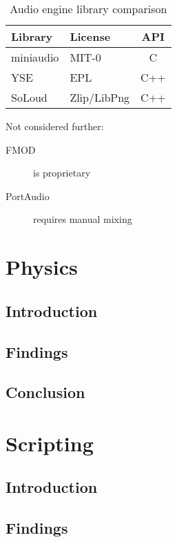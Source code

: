 \documentclass{projdoc}
\begin{document}
\begin{table}
	\centering
	\begin{tabular}{llc}
		\toprule
		\textbf{Library} & \textbf{License} & \textbf{API}\\
		\midrule
		miniaudio & MIT-0 & C\\
		YSE & EPL & C++\\
		SoLoud & Zlip/LibPng & C++\\
		\bottomrule
	\end{tabular}
	\caption{Audio engine library comparison}
	\label{tab:audio-engines}
\end{table}

Not considered further:
\begin{description}
	\item[FMOD] is proprietary
	\item[PortAudio] requires manual mixing
\end{description}

\section{Physics}

\subsection{Introduction}

\subsection{Findings}

\subsection{Conclusion}

\section{Scripting}

\subsection{Introduction}

\subsection{Findings}
\end{document}
